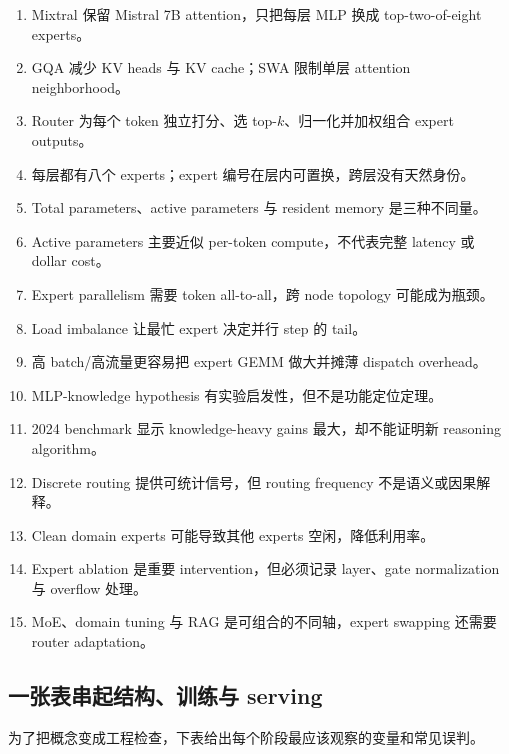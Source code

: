 \documentclass[a4paper]{article}
\begin{document}
\begin{enumerate}
  \item Mixtral 保留 Mistral 7B attention，只把每层 MLP 换成 top-two-of-eight experts。
  \item GQA 减少 KV heads 与 KV cache；SWA 限制单层 attention neighborhood。
  \item Router 为每个 token 独立打分、选 top-$k$、归一化并加权组合 expert outputs。
  \item 每层都有八个 experts；expert 编号在层内可置换，跨层没有天然身份。
  \item Total parameters、active parameters 与 resident memory 是三种不同量。
  \item Active parameters 主要近似 per-token compute，不代表完整 latency 或 dollar cost。
  \item Expert parallelism 需要 token all-to-all，跨 node topology 可能成为瓶颈。
  \item Load imbalance 让最忙 expert 决定并行 step 的 tail。
  \item 高 batch/高流量更容易把 expert GEMM 做大并摊薄 dispatch overhead。
  \item MLP-knowledge hypothesis 有实验启发性，但不是功能定位定理。
  \item 2024 benchmark 显示 knowledge-heavy gains 最大，却不能证明新 reasoning algorithm。
  \item Discrete routing 提供可统计信号，但 routing frequency 不是语义或因果解释。
  \item Clean domain experts 可能导致其他 experts 空闲，降低利用率。
  \item Expert ablation 是重要 intervention，但必须记录 layer、gate normalization 与 overflow 处理。
  \item MoE、domain tuning 与 RAG 是可组合的不同轴，expert swapping 还需要 router adaptation。
\end{enumerate}

\subsection{一张表串起结构、训练与 serving}

为了把概念变成工程检查，下表给出每个阶段最应该观察的变量和常见误判。
\end{document}
